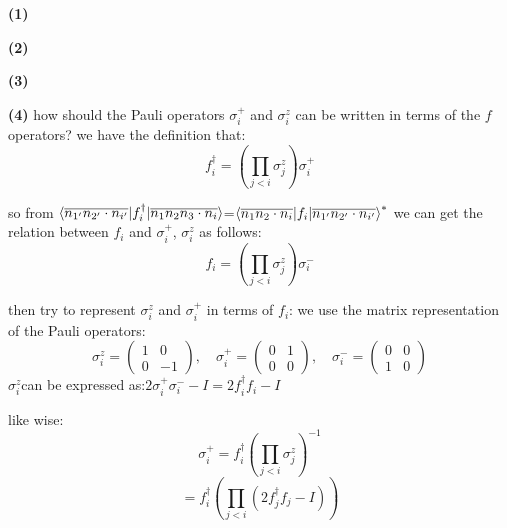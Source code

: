 \documentclass[12pt]{article}
\begin{document}
\textbf{(1)}

\textbf{(2)}

\textbf{(3)}

\textbf{(4)}
how should the Pauli operators $\sigma_i^+ $ and $\sigma_i^z $ can be written in terms of the  $f$ operators? 
we have the definition that:\[
f_i^\dagger = \left( \prod_{j<i} \sigma_j^z \right) \sigma_i^+
\]

so from $\braket{\overline{n_{1'}n_{2'}\cdot n_{i'}}|f_i^\dagger|\overline{n_1n_2n_3\cdot n_i}}$=$\braket{\overline{n_{1}n_{2}\cdot n_{i}}|f_i|\overline{n_{1'}n_{2'}\cdot n_{i'}}}^*$
we can get the relation between $f_i$ and $\sigma_i^+$, $\sigma_i^z$ as follows:
\[
f_i = \left( \prod_{j<i} \sigma_j^z \right) \sigma_i^-
\]

then try to represent $\sigma_i^z$ and $\sigma_i^+$ in terms of $f_i$:
we use the matrix representation of the Pauli operators:
\[
\sigma_i^z = \begin{pmatrix}
1 & 0 \\
0 & -1
\end{pmatrix}, \quad \sigma_i^+ = \begin{pmatrix}
0 & 1 \\
0 & 0
\end{pmatrix}, \quad \sigma_i^- = \begin{pmatrix}
0 & 0 \\
1 & 0
\end{pmatrix}
\]
$\sigma_i^z  $can be expressed as:$  2\sigma_i^+\sigma_i^- -I = 2f_i^{\dagger} f_i-I$


like wise:
\[
\sigma_i^+ = f_i^{\dagger} \left( \prod_{j<i} \sigma_j^z \right)^{-1}
\]
\[
= f_i^{\dagger} \left( \prod_{j<i} (2f_j^{\dagger} f_j - I) \right)
\]
\end{document}
